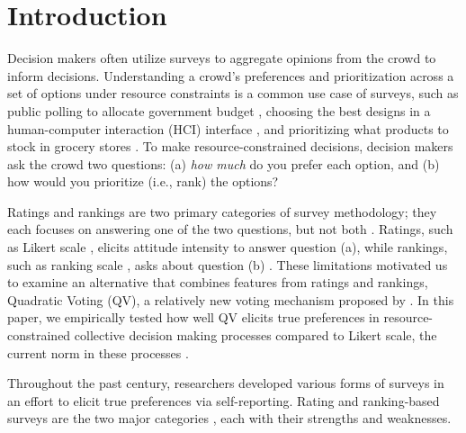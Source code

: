 

\section{Introduction}
Decision makers often utilize surveys to aggregate opinions from the crowd to inform decisions. Understanding a crowd's preferences and prioritization across a set of options under resource constraints is a common use case of surveys, such as public polling to allocate government budget \cite{pew_spending}, choosing the best designs in a human-computer interaction (HCI) interface \cite{ledo2018evaluation}, and prioritizing what products to stock in grocery stores \cite{nielsen}. To make resource-constrained decisions, decision makers ask the crowd two questions: (a) \textit{how much} do you prefer each option, and (b) how would you prioritize (i.e., rank) the options? 

Ratings and rankings are two primary categories of survey methodology; they each focuses on answering one of the two questions, but not both \cite{moors2016two}. Ratings, such as Likert scale \cite{likert1932technique}, elicits attitude intensity to answer question (a), while rankings, such as ranking scale \cite{starch1923methods}, asks about question (b) \cite{moors2016two}. These limitations motivated us to examine an alternative that combines features from ratings and rankings, Quadratic Voting (QV), a relatively new voting mechanism proposed by \textcite{posner2018radical}. In this paper, we empirically tested how well QV elicits true preferences in resource-constrained collective decision making processes compared to Likert scale, the current norm in these processes \cite{moors2016two}.

Throughout the past century, researchers developed various forms of surveys in an effort to elicit true preferences via self-reporting. Rating and ranking-based surveys are the two major categories \cite{moors2016two}, each with their strengths and weaknesses. 

